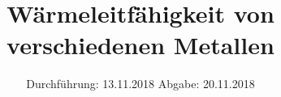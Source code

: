 

\subject{V204}
\title{Wärmeleitfähigkeit von verschiedenen Metallen}
\date{%
  Durchführung: 13.11.2018
  \hspace{3em}
  Abgabe: 20.11.2018
}



\maketitle
\thispagestyle{empty}
\tableofcontents
\newpage







\nocite{v204}
\printbibliography{}


